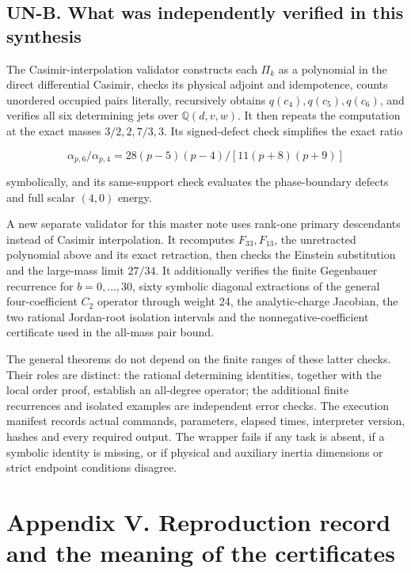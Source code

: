 \hypertarget{un-b.-what-was-independently-verified-in-this-synthesis}{%
\subsection{UN-B. What was independently verified in this synthesis}\label{un-b.-what-was-independently-verified-in-this-synthesis}}

The Casimir-interpolation validator constructs each \(\Pi_k\) as a polynomial in the direct differential Casimir, checks its physical adjoint and idempotence, counts unordered occupied pairs literally, recursively obtains \(q(c_4),q(c_5),q(c_6)\), and verifies all six determining jets over \(\mathbb Q(d,v,w)\). It then repeats the computation at the exact masses \(3/2,2,7/3,3\). Its signed-defect check simplifies the exact ratio

\[
\alpha_{p,6}/\alpha_{p,4}
=28(p-5)(p-4)/[11(p+8)(p+9)]
\]

symbolically, and its same-support check evaluates the phase-boundary defects and full scalar \((4,0)\) energy.

A new separate validator for this master note uses rank-one primary descendants instead of Casimir interpolation. It recomputes \(F_{33},F_{13}\), the unretracted polynomial above and its exact retraction, then checks the Einstein substitution and the large-mass limit \(27/34\). It additionally verifies the finite Gegenbauer recurrence for \(b=0,\ldots,30\), sixty symbolic diagonal extractions of the general four-coefficient \(C_2\) operator through weight 24, the analytic-charge Jacobian, the two rational Jordan-root isolation intervals and the nonnegative-coefficient certificate used in the all-mass pair bound.

The general theorems do not depend on the finite ranges of these latter checks. Their roles are distinct: the rational determining identities, together with the local order proof, establish an all-degree operator; the additional finite recurrences and isolated examples are independent error checks. The execution manifest records actual commands, parameters, elapsed times, interpreter version, hashes and every required output. The wrapper fails if any task is absent, if a symbolic identity is missing, or if physical and auxiliary inertia dimensions or strict endpoint conditions disagree.

\clearpage
\hypertarget{appendix-v.-reproduction-record-and-the-meaning-of-the-certificates}{%
\section{Appendix V. Reproduction record and the meaning of the certificates}\label{appendix-v.-reproduction-record-and-the-meaning-of-the-certificates}}

